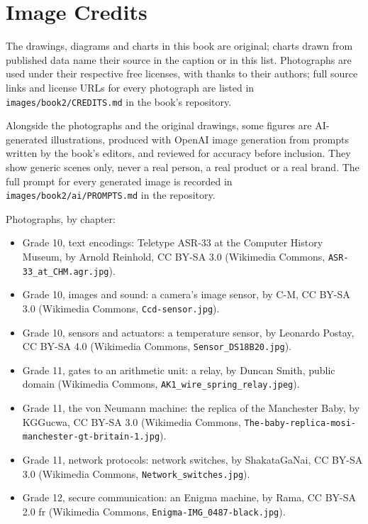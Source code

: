 \chapter*{Image Credits}

The drawings, diagrams and charts in this book are original; charts drawn
from published data name their source in the caption or in this list.
Photographs are used under their respective free licenses, with thanks to
their authors; full source links and license URLs for every photograph are
listed in \texttt{images/book2/CREDITS.md} in the book's repository.

\bigskip
Alongside the photographs and the original drawings, some figures are
AI-generated illustrations, produced with OpenAI image generation from
prompts written by the book's editors, and reviewed for accuracy before
inclusion. They show generic scenes only, never a real person, a real
product or a real brand. The full prompt for every generated image is
recorded in \texttt{images/book2/ai/PROMPTS.md} in the repository.

\bigskip
\noindent Photographs, by chapter:
\begin{itemize}\small
  \item Grade 10, text encodings: Teletype ASR-33 at the Computer History Museum, by Arnold Reinhold, CC BY-SA 3.0
    (Wikimedia Commons, \texttt{ASR-33\_at\_CHM.agr.jpg}).
  \item Grade 10, images and sound: a camera's image sensor, by C-M, CC BY-SA 3.0 (Wikimedia Commons,
    \texttt{Ccd-sensor.jpg}).
  \item Grade 10, sensors and actuators: a temperature sensor, by Leonardo Postay, CC BY-SA 4.0 (Wikimedia
    Commons, \texttt{Sensor\_DS18B20.jpg}).
  \item Grade 11, gates to an arithmetic unit: a relay, by Duncan Smith, public domain (Wikimedia Commons,
    \texttt{AK1\_wire\_spring\_relay.jpeg}).
  \item Grade 11, the von Neumann machine: the replica of the Manchester Baby, by KGGucwa, CC BY-SA 3.0
    (Wikimedia Commons, \texttt{The-baby-replica-mosi-manchester-gt-britain-1.jpg}).
  \item Grade 11, network protocols: network switches, by ShakataGaNai, CC BY-SA 3.0 (Wikimedia Commons,
    \texttt{Network\_switches.jpg}).
  \item Grade 12, secure communication: an Enigma machine, by Rama, CC BY-SA 2.0 fr (Wikimedia Commons,
    \texttt{Enigma-IMG\_0487-black.jpg}).
\end{itemize}
